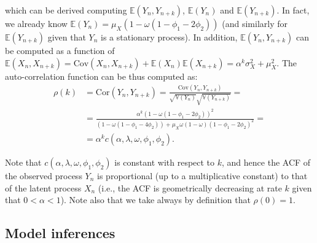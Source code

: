 \documentclass[12pt,twoside, A4paper]{article}
\begin{document}
which can be derived computing $\mathbb{E}(Y_n,Y_{n+k})$, $\mathbb{E}(Y_n)$ and $\mathbb{E}(Y_{n+k})$. In fact, we already know $\mathbb{E}(Y_n)=\mu_X(1-\omega(1-\phi_1-2\phi_2))$ (and similarly for $\mathbb{E}(Y_{n+k})$ given that $Y_n$ is a stationary process). In addition, $\mathbb{E}(Y_n,Y_{n+k})$ can be computed as a function of $\mathbb{E}(X_n,X_{n+k})=\textrm{Cov}(X_n,X_{n+k})+\mathbb{E}(X_n)\mathbb{E}(X_{n+k})=\alpha^k\sigma_X^2+\mu_X^2$. The auto-correlation function can be thus computed as:
\begin{align}
\rho(k)&=\textrm{Cor}\left(Y_n,Y_{n+k}\right)=\frac{\textrm{Cov}(Y_n,Y_{n+k})}{\sqrt{\mathbb{V}(Y_n)}\sqrt{\mathbb{V}(Y_{n+k})}}=\\&=\frac{\alpha^k\left(1-\omega\left(1-\phi_1-2\phi_2\right)\right)^2}{(1-\omega (1-\phi_1-4\phi_2))+\mu_X\omega(1-\omega)(1-\phi_1-2\phi_2)^2} = \nonumber \\ &= \alpha^k c(\alpha,\lambda,\omega,\phi_1,\phi_2). \nonumber 
\end{align}

Note that $c(\alpha,\lambda,\omega,\phi_1,\phi_2)$ is constant with respect to $k$, and hence the ACF of the observed process $Y_n$ is proportional (up to a multiplicative constant) to that of the latent process $X_n$ (i.e., the ACF is geometrically decreasing at rate $k$ given that $0<\alpha<1$). Note also that we take always by definition that $\rho(0)=1$.

\subsection*{Model inferences}
\end{document}
